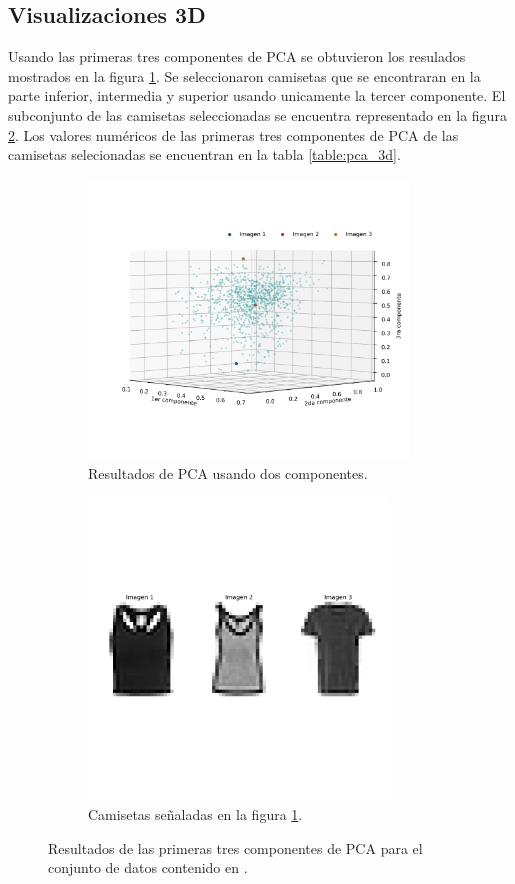\subsection*{Visualizaciones 3D}

Usando las primeras tres componentes de PCA se obtuvieron los resulados mostrados en la figura \ref{fig:problema5_pca_3d}. Se seleccionaron camisetas que se encontraran en la parte inferior, intermedia y superior usando unicamente la tercer componente. El subconjunto de las camisetas seleccionadas se encuentra representado en la figura \ref{fig:problema5_pca_3d_camisetas}. Los valores numéricos de las primeras tres componentes de PCA de las camisetas selecionadas se encuentran en la tabla \ref{table:pca_3d}.

\begin{figure}[H]
    \centering
    \begin{subfigure}{8.5cm}
        \includegraphics[width=8.5cm]{Graphics/Problema_3_1/loadings_3d.png}
        \caption{Resultados de PCA usando dos componentes.}
        \label{fig:problema5_pca_3d}
    \end{subfigure}
    \begin{subfigure}{8cm}
        \includegraphics[width=8cm]{Graphics/Problema_3_1/T_shirts_3d.png}
        \caption{Camisetas señaladas en la figura \ref{fig:problema5_pca_3d}.}
        \label{fig:problema5_pca_3d_camisetas}
    \end{subfigure}
    \caption{Resultados de las primeras tres componentes de PCA para el conjunto de datos contenido en .}
    \label{fig:pca_3d}
\end{figure}

